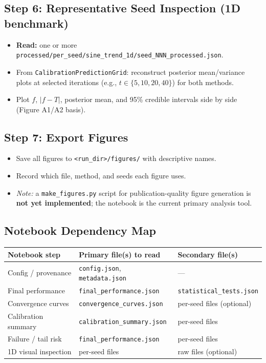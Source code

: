 \documentclass[11pt]{article}
\begin{document}
\subsection{Step 6: Representative Seed Inspection (1D benchmark)}
 
\begin{itemize}
  \item \textbf{Read:} one or more
        \texttt{processed/per\_seed/sine\_trend\_1d/seed\_NNN\_processed.json}.
  \item From \texttt{CalibrationPredictionGrid}: reconstruct posterior mean/variance
        plots at selected iterations (e.g., $t \in \{5, 10, 20, 40\}$) for both methods.
  \item Plot $f$, $|f-T|$, posterior mean, and 95\% credible intervals side by side
        (Figure A1/A2 basis).
\end{itemize}
 
\subsection{Step 7: Export Figures}
 
\begin{itemize}
  \item Save all figures to \texttt{<run\_dir>/figures/} with descriptive names.
  \item Record which file, method, and seeds each figure uses.
  \item \textit{Note:} a \texttt{make\_figures.py} script for publication-quality
        figure generation is \textbf{not yet implemented}; the notebook is the current
        primary analysis tool.
\end{itemize}
 
\subsection{Notebook Dependency Map}
 
\begin{center}
\begin{tabular}{lll}
\toprule
Notebook step & Primary file(s) to read & Secondary file(s) \\
\midrule
Config / provenance & \texttt{config.json}, \texttt{metadata.json} & --- \\
Final performance & \texttt{final\_performance.json} & \texttt{statistical\_tests.json} \\
Convergence curves & \texttt{convergence\_curves.json} & per-seed files (optional) \\
Calibration summary & \texttt{calibration\_summary.json} & per-seed files \\
Failure / tail risk & \texttt{final\_performance.json} & per-seed files \\
1D visual inspection & per-seed files & raw files (optional) \\
\bottomrule
\end{tabular}
\end{center}
 
\end{document}
